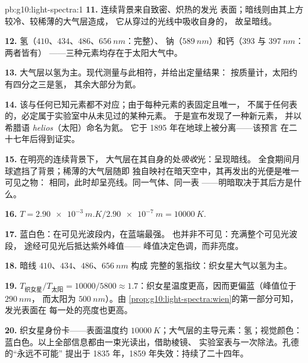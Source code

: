 \begin{solution}{pb:g10:light-spectra:1}
\textbf{11.} 连续背景来自致密、炽热的发光
表面；暗线则由其上方较冷、较稀薄的大气层造成，
它从穿过的光线中吸收自身的，
故呈暗线。

\textbf{12.} 氢（$410$、$434$、$486$、$\qty{656}{nm}$：完整）、
钠（$\qty{589}{nm}$）和钙（$393$ 与 $\qty{397}{nm}$：两者皆有）
——三种元素均存在于太阳大气中。

\textbf{13.} 大气层以氢为主。现代测量与此相符，并给出定量结果：
按质量计，太阳约有四分之三是氢，
其余大部分为氦。

\textbf{14.} 该与任何已知元素都不对应；由于每种元素的表固定且唯一，
不属于任何表的，必定属于实验室中从未见过的某种元素。
于是宣布发现了一种新元素，
并以希腊语 \emph{helios}（太阳）命名为氦。
它于 1895 年在地球上被分离——该预言
在二十七年后得到证实。

\textbf{15.} 在明亮的连续背景下，
大气层在其自身的处\emph{吸收}光：呈现暗线。
全食期间月球遮挡了背景；稀薄的大气层随即
独自映衬在暗天空中，其再发出的光便是唯一可见之物：
相同，此时却呈亮线。同一气体、同一表
——明暗取决于其后方是什么。

\textbf{16.} $T = \qty{2.90e-3}{m.K} / \qty{2.90e-7}{m}
= \qty{10000}{K}$.

\textbf{17.} 蓝白色：在可见光波段内，在蓝端最强。
也并非不可见：充满整个可见光波段，
途经可见光后抵达紫外峰值——
峰值决定色调，而非亮度。

\textbf{18.} 暗线 $410$、$434$、$486$、$\qty{656}{nm}$ 构成
完整的氢指纹：织女星大气以氢为主。

\textbf{19.} $T_{\text{织女星}} / T_{\text{太阳}} = 10000 / 5800 \approx
1.7$：织女星温度更高，因而更偏蓝（峰值位于 $\qty{290}{nm}$，
而太阳为 $\qty{500}{nm}$）。由
\cref{prop:g10:light-spectra:wien}的第一部分可知，发光表面在
每一处的亮度也更高。

\textbf{20.} 织女星身份卡——表面温度约
$\qty{10000}{K}$；大气层的主导元素：氢；视觉颜色：
蓝白色。以上全部信息都由一束光读出，借助棱镜、
实验室表与一次除法。孔德的“永远不可能”
提出于 1835 年，1859 年失效：持续了二十四年。
\end{solution}
